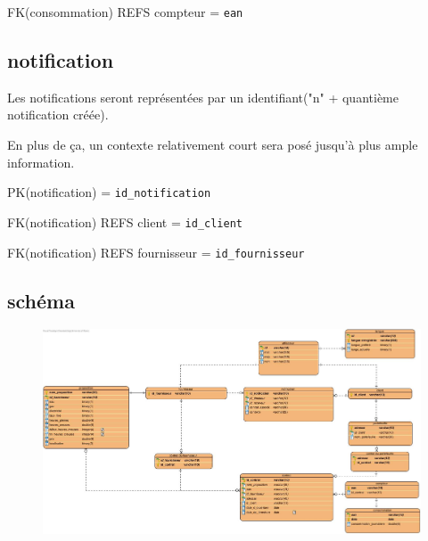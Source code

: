 \begin{flushleft}
FK(consommation) REFS compteur = \texttt{ean}
\end{flushleft}

\subsection{notification}
\begin{flushleft}
Les notifications seront représentées par un identifiant("n" + quantième notification créée).
\end{flushleft}

\begin{flushleft}
En plus de ça, un contexte relativement court sera posé jusqu'à plus ample information.
\end{flushleft}

\begin{flushleft}
PK(notification) = \texttt{id\_notification}
\end{flushleft}

\begin{flushleft}
FK(notification) REFS client = \texttt{id\_client}

FK(notification) REFS fournisseur = \texttt{id\_fournisseur}
\newpage

\end{flushleft}
\subsection{schéma}
\begin{figure}[h]
\includegraphics[scale=0.3]{Base/bdd/img/bdd.jpg}
\end{figure}
